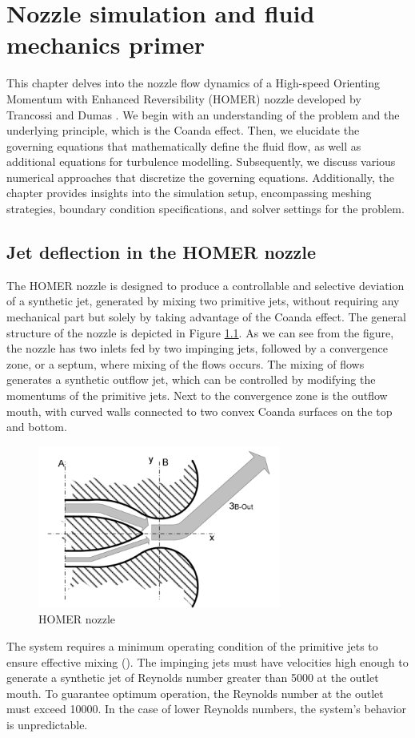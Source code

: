 \chapter{Nozzle simulation and fluid mechanics primer}
\label{chap:Theory-CFD}
This chapter delves into the nozzle flow dynamics of a High-speed Orienting Momentum with Enhanced Reversibility (HOMER) nozzle developed by Trancossi and Dumas \cite{trandum}. We begin with an understanding of the problem and the underlying principle, which is the Coanda effect. Then, we elucidate the governing equations that mathematically define the fluid flow, as well as additional equations for turbulence modelling. Subsequently, we discuss various numerical approaches that discretize the governing equations. Additionally, the chapter provides insights into the simulation setup, encompassing meshing strategies, boundary condition specifications, and solver settings for the problem. 
\section{Jet deflection in the HOMER nozzle}  
The HOMER nozzle is designed to produce a controllable and selective deviation of a synthetic jet, generated by mixing two primitive jets, without requiring any mechanical part but solely by taking advantage of the Coanda effect. The general structure of the nozzle is depicted in Figure \ref{fig:nozzle}. As we can see from the figure, the nozzle has two inlets fed by two impinging jets, followed by a convergence zone, or a septum, where mixing of the flows occurs. The mixing of flows generates a synthetic outflow jet, which can be controlled by modifying the momentums of the primitive jets. Next to the convergence zone is the outflow mouth, with curved walls connected to two convex Coanda surfaces on the top and bottom.
\begin{figure}[ht]
  \centering
  \includegraphics[width=8cm]{images/Theory-CFD/nozzle2.png}
  \caption{HOMER nozzle}
  \label{fig:nozzle}
\end{figure}
The system requires a minimum operating condition of the primitive jets to ensure effective mixing (\cite{trandum}). The impinging jets must have velocities high enough to generate a synthetic jet of Reynolds number greater than 5000 at the outlet mouth. To guarantee optimum operation, the Reynolds number at the outlet must exceed 10000. In the case of lower Reynolds numbers, the system's behavior is unpredictable. 

